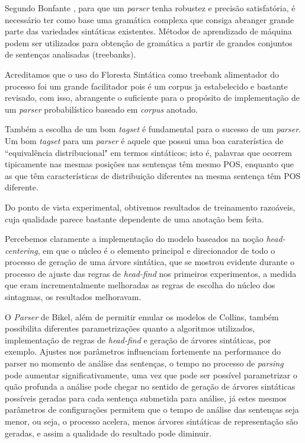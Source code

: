 Segundo Bonfante \cite{bonfante03}, para que um \emph{parser} tenha robustez e precisão satisfatória, é necessário ter como base uma gramática complexa que consiga abranger grande parte das variedades sintáticas existentes. Métodos de aprendizado de máquina podem ser utilizados para obtençâo de gramática a partir de grandes conjuntos de sentenças analisadas (treebanks). 

Acreditamos que o uso do Floresta Sintática como treebank alimentador do processo foi um grande facilitador pois é um corpus ja estabelecido e bastante revisado, com isso, abrangente o suficiente para o propósito de implementação de um \emph{parser} probabilístico baseado em \emph{corpus} anotado.

Também a escolha de um bom \emph{tagset} é fundamental para o sucesso de um \emph{parser}. Um bom \emph{tagset} para um \emph{parser} é aquele que possui uma boa caraterística de ``equivalência distribucional" em termos sintáticos; isto é, palavras que ocorrem tipicamente nas mesmas posições nas sentenças têm mesmo POS, enquanto que as que têm características de distribuição diferentes na mesma sentença têm POS diferente. 

Do ponto de vista experimental, obtivemos resultados de treinamento razoáveis, cuja qualidade parece bastante dependente de uma anotação bem feita. 

Percebemos claramente a implementação do modelo baseados na noção \emph{head-centering}, em que o núcleo é o elemento principal e direcionador de todo o processo de geração de uma árvore sintática, que se mostrou evidente durante o processo de ajuste das regras de \emph{head-find} nos primeiros experimentos, a medida que eram incrementalmente melhoradas as regras de escolha do núcleo dos sintagmas, os resultados melhoravam.

O \emph{Parser} de Bikel, além de permitir emular os modelos de Collins, também possibilita diferentes parametrizações quanto a algoritmos utilizados, implementação de regras de \emph{head-find} e geração de árvores sintáticas, por exemplo. Ajustes nos parâmetros influenciam fortemente na performance do parser no momento de análise das sentenças, o tempo no processo de \emph{parsing} pode aumentar significativamente, uma vez que pode ser possível parametrizar o quão profunda a análise pode chegar no sentido de geração de árvores sintáticas possíveis geradas para cada sentença submetida para análise, já estes mesmos parâmetros de configurações permitem que o tempo de análise das sentenças seja menor, ou seja, o processo acelera, menos árvores sintáticas de representação são geradas, e assim a qualidade do resultado pode diminuir.

